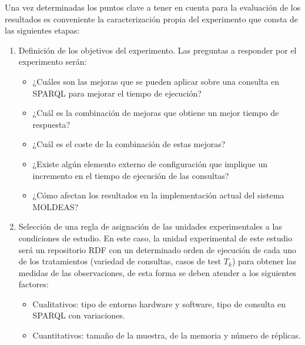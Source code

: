 Una vez determinadas los puntos clave a tener en cuenta para la evaluación de los resultados es conveniente la caracterización 
propia del experimento que consta de las siguientes etapas:
\begin{enumerate}
 \item Definición de los objetivos del experimento. Las preguntas a responder por el experimento serán:
\begin{itemize}
 \item ¿Cuáles son las mejoras que se pueden aplicar sobre una consulta en SPARQL para mejorar el tiempo de ejecución?
 \item ¿Cuál es la combinación de mejoras que obtiene un mejor tiempo de respuesta?
 \item ¿Cuál es el coste de la combinación de estas mejoras? 
 \item ¿Existe algún elemento externo de configuración que implique un incremento en el tiempo de ejecución de las consultas? 
 \item ¿Cómo afectan los resultados en la implementación actual del sistema \gls{MOLDEAS}?
\end{itemize}
 \item Selección de una regla de asignación de las unidades experimentales a las condiciones de estudio. En este caso, 
la unidad experimental de este estudio será un repositorio RDF con un determinado orden de ejecución de cada uno 
de los tratamientos (variedad de consultas, casos de test $T_k$) para obtener las medidas de las observaciones, de esta forma se deben atender a los siguientes factores:
\begin{itemize}
 \item Cualitativos: tipo de entorno hardware y software, tipo de consulta en SPARQL con variaciones.
 \item Cuantitativos: tamaño de la muestra, de la memoria y número de réplicas.
\end{itemize}


\end{enumerate}

